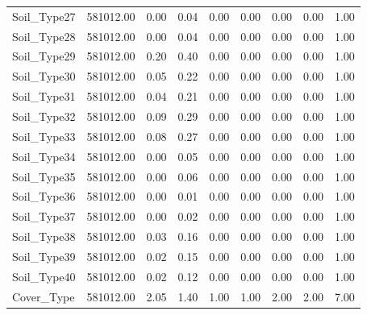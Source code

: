 \begin{longtable}{lrrrrrrrr}
Soil\_Type27 & 581012.00 & 0.00 & 0.04 & 0.00 & 0.00 & 0.00 & 0.00 & 1.00 \\
Soil\_Type28 & 581012.00 & 0.00 & 0.04 & 0.00 & 0.00 & 0.00 & 0.00 & 1.00 \\
Soil\_Type29 & 581012.00 & 0.20 & 0.40 & 0.00 & 0.00 & 0.00 & 0.00 & 1.00 \\
Soil\_Type30 & 581012.00 & 0.05 & 0.22 & 0.00 & 0.00 & 0.00 & 0.00 & 1.00 \\
Soil\_Type31 & 581012.00 & 0.04 & 0.21 & 0.00 & 0.00 & 0.00 & 0.00 & 1.00 \\
Soil\_Type32 & 581012.00 & 0.09 & 0.29 & 0.00 & 0.00 & 0.00 & 0.00 & 1.00 \\
Soil\_Type33 & 581012.00 & 0.08 & 0.27 & 0.00 & 0.00 & 0.00 & 0.00 & 1.00 \\
Soil\_Type34 & 581012.00 & 0.00 & 0.05 & 0.00 & 0.00 & 0.00 & 0.00 & 1.00 \\
Soil\_Type35 & 581012.00 & 0.00 & 0.06 & 0.00 & 0.00 & 0.00 & 0.00 & 1.00 \\
Soil\_Type36 & 581012.00 & 0.00 & 0.01 & 0.00 & 0.00 & 0.00 & 0.00 & 1.00 \\
Soil\_Type37 & 581012.00 & 0.00 & 0.02 & 0.00 & 0.00 & 0.00 & 0.00 & 1.00 \\
Soil\_Type38 & 581012.00 & 0.03 & 0.16 & 0.00 & 0.00 & 0.00 & 0.00 & 1.00 \\
Soil\_Type39 & 581012.00 & 0.02 & 0.15 & 0.00 & 0.00 & 0.00 & 0.00 & 1.00 \\
Soil\_Type40 & 581012.00 & 0.02 & 0.12 & 0.00 & 0.00 & 0.00 & 0.00 & 1.00 \\
Cover\_Type & 581012.00 & 2.05 & 1.40 & 1.00 & 1.00 & 2.00 & 2.00 & 7.00 \\
\end{longtable}
